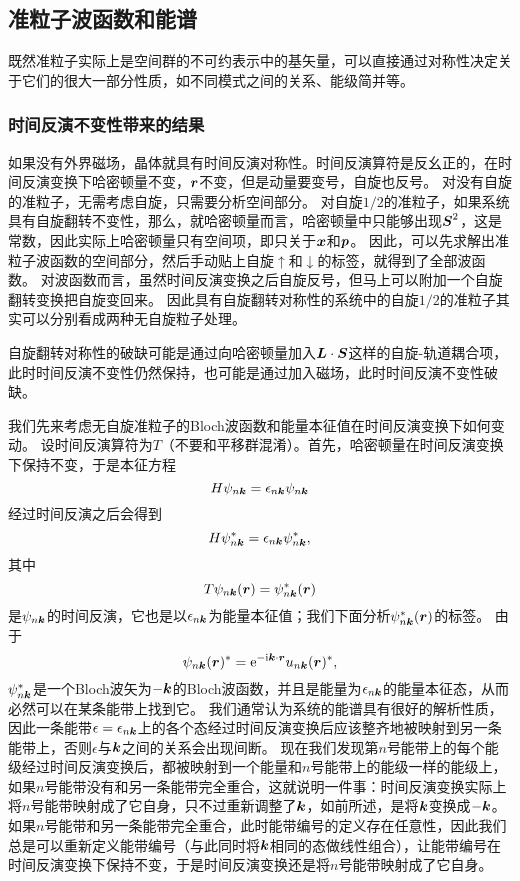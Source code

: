 \subsection{准粒子波函数和能谱}\label{sec:quasi-particle-spectrum}

既然准粒子实际上是空间群的不可约表示中的基矢量，可以直接通过对称性决定关于它们的很大一部分性质，如不同模式之间的关系、能级简并等。

\subsubsection{时间反演不变性带来的结果} 

如果没有外界磁场，晶体就具有时间反演对称性。时间反演算符是反幺正的，在时间反演变换下哈密顿量不变，$\vb*{r}$不变，但是动量要变号，自旋也反号。
对没有自旋的准粒子，无需考虑自旋，只需要分析空间部分。
对自旋$1/2$的准粒子，如果系统具有自旋翻转不变性，那么，就哈密顿量而言，哈密顿量中只能够出现$\vb*{S}^2$，这是常数，因此实际上哈密顿量只有空间项，即只关于$\vb*{x}$和$\vb*{p}$。
因此，可以先求解出准粒子波函数的空间部分，然后手动贴上自旋$\uparrow$和$\downarrow$的标签，就得到了全部波函数。
对波函数而言，虽然时间反演变换之后自旋反号，但马上可以附加一个自旋翻转变换把自旋变回来。
因此具有自旋翻转对称性的系统中的自旋$1/2$的准粒子其实可以分别看成两种无自旋粒子处理。

自旋翻转对称性的破缺可能是通过向哈密顿量加入$\vb*{L} \cdot \vb*{S}$这样的自旋-轨道耦合项，此时时间反演不变性仍然保持，也可能是通过加入磁场，此时时间反演不变性破缺。

我们先来考虑无自旋准粒子的Bloch波函数和能量本征值在时间反演变换下如何变动。
设时间反演算符为$T$（不要和平移群混淆）。首先，哈密顿量在时间反演变换下保持不变，于是本征方程
\[
    H \psi_{n \vb*{k}} = \epsilon_{n \vb*{k}} \psi_{n \vb*{k}}
\]
经过时间反演之后会得到
\[
    H \psi_{n \vb*{k}}^* = \epsilon_{n \vb*{k}} \psi_{n \vb*{k}}^*,
\]
其中
\[
    T \psi_{n \vb*{k}}(\vb*{r}) = \psi^*_{n \vb*{k}}(\vb*{r})
\]
是$\psi_{n \vb*{k}}$的时间反演，它也是以$\epsilon_{n \vb*{k}}$为能量本征值；我们下面分析$\psi^*_{n \vb*{k}}(\vb*{r})$的标签。
由于
\[
    \psi_{n \vb*{k}}(\vb*{r})^* = \mathrm{e}^{- \mathrm{i} \vb*{k} \cdot \vb*{r}} u_{n \vb*{k}}(\vb*{r})^*,
\]
$\psi_{n \vb*{k}}^*$是一个Bloch波矢为$-\vb*{k}$的Bloch波函数，并且是能量为$\epsilon_{n \vb*{k}}$的能量本征态，从而必然可以在某条能带上找到它。
我们通常认为系统的能谱具有很好的解析性质，因此一条能带$\epsilon = \epsilon_{n \vb*{k}}$上的各个态经过时间反演变换后应该整齐地被映射到另一条能带上，否则$\epsilon$与$\vb*{k}$之间的关系会出现间断。
现在我们发现第$n$号能带上的每个能级经过时间反演变换后，都被映射到一个能量和$n$号能带上的能级一样的能级上，如果$n$号能带没有和另一条能带完全重合，这就说明一件事：时间反演变换实际上将$n$号能带映射成了它自身，只不过重新调整了$\vb*{k}$，如前所述，是将$\vb*{k}$变换成$- \vb*{k}$。
如果$n$号能带和另一条能带完全重合，此时能带编号的定义存在任意性，因此我们总是可以重新定义能带编号（与此同时将$\vb*{k}$相同的态做线性组合），让能带编号在时间反演变换下保持不变，于是时间反演变换还是将$n$号能带映射成了它自身。

